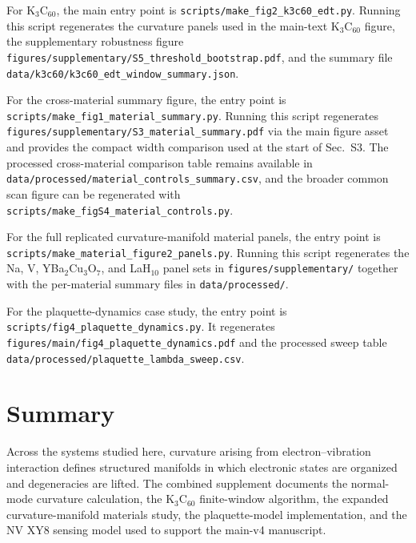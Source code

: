 \documentclass[12pt]{article}
\begin{document}
For K$_3$C$_{60}$, the main entry point is
\texttt{scripts/make\_fig2\_k3c60\_edt.py}. Running this script regenerates the
curvature panels used in the main-text K$_3$C$_{60}$ figure, the supplementary
robustness figure \texttt{figures/supplementary/S5\_threshold\_bootstrap.pdf},
and the summary file \texttt{data/k3c60/k3c60\_edt\_window\_summary.json}.

For the cross-material summary figure, the entry point is
\texttt{scripts/make\_fig1\_material\_summary.py}. Running this script
regenerates \texttt{figures/supplementary/S3\_material\_summary.pdf} via the
main figure asset and provides the compact width comparison used at the start of
Sec.~S3. The processed cross-material comparison table remains available in
\texttt{data/processed/material\_controls\_summary.csv}, and the broader common
scan figure can be regenerated with
\texttt{scripts/make\_figS4\_material\_controls.py}.

For the full replicated curvature-manifold material panels, the entry point is
\texttt{scripts/make\_material\_figure2\_panels.py}. Running this script
regenerates the Na, V, YBa$_2$Cu$_3$O$_7$, and LaH$_{10}$ panel sets in
\texttt{figures/supplementary/} together with the per-material summary files in
\texttt{data/processed/}.

For the plaquette-dynamics case study, the entry point is
\texttt{scripts/fig4\_plaquette\_dynamics.py}. It regenerates
\texttt{figures/main/fig4\_plaquette\_dynamics.pdf} and the processed sweep
table \texttt{data/processed/plaquette\_lambda\_sweep.csv}.

\section*{Summary}

Across the systems studied here, curvature arising from electron--vibration
interaction defines structured manifolds in which electronic states are
organized and degeneracies are lifted. The combined supplement documents the
normal-mode curvature calculation, the K$_3$C$_{60}$ finite-window algorithm,
the expanded curvature-manifold materials study, the plaquette-model
implementation, and the NV XY8 sensing model used to support the main-v4
manuscript.



\end{document}
